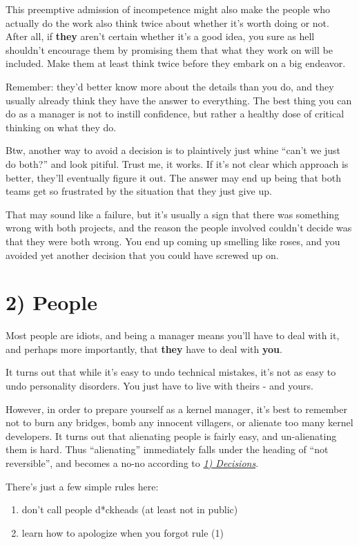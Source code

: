 \documentclass[a4paper,8pt,english]{sphinxmanual}
\begin{document}
This preemptive admission of incompetence might also make the people who
actually do the work also think twice about whether it's worth doing or
not.  After all, if \textbf{they} aren't certain whether it's a good idea, you
sure as hell shouldn't encourage them by promising them that what they
work on will be included.  Make them at least think twice before they
embark on a big endeavor.

Remember: they'd better know more about the details than you do, and
they usually already think they have the answer to everything.  The best
thing you can do as a manager is not to instill confidence, but rather a
healthy dose of critical thinking on what they do.

Btw, another way to avoid a decision is to plaintively just whine ``can't
we just do both?'' and look pitiful.  Trust me, it works.  If it's not
clear which approach is better, they'll eventually figure it out.  The
answer may end up being that both teams get so frustrated by the
situation that they just give up.

That may sound like a failure, but it's usually a sign that there was
something wrong with both projects, and the reason the people involved
couldn't decide was that they were both wrong.  You end up coming up
smelling like roses, and you avoided yet another decision that you could
have screwed up on.


\section{2) People}
\label{process/management-style:people}
Most people are idiots, and being a manager means you'll have to deal
with it, and perhaps more importantly, that \textbf{they} have to deal with
\textbf{you}.

It turns out that while it's easy to undo technical mistakes, it's not
as easy to undo personality disorders.  You just have to live with
theirs - and yours.

However, in order to prepare yourself as a kernel manager, it's best to
remember not to burn any bridges, bomb any innocent villagers, or
alienate too many kernel developers. It turns out that alienating people
is fairly easy, and un-alienating them is hard. Thus ``alienating''
immediately falls under the heading of ``not reversible'', and becomes a
no-no according to {\hyperref[process/management\string-style:decisions]{\emph{1) Decisions}}}.

There's just a few simple rules here:
\begin{enumerate}
\item {} 
don't call people d*ckheads (at least not in public)

\item {} 
learn how to apologize when you forgot rule (1)

\end{enumerate}
\end{document}
